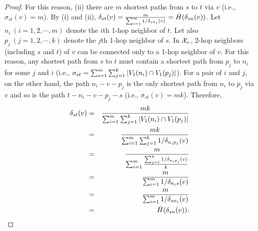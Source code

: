 \begin{theorem}
\begin{proof}
For this reason, (ii) there are $m$ shortest paths from $s$ to $t$ via $v$ (i.e., $\sigma_{st}(v)=m$).
By (i) and (ii), $\D{s}{t}{v} = \frac{m}{\sum_{i=1}^m 1/\D{s}{n_i}{v}} = \bar{H}(\D{s}{n}{v})$.
Let $n_i~(i=1,2,\cdots,m)$ denote the $i$th 1-hop neighbor of $t$. 
Let also $p_j~(j=1,2,\cdots,k)$ denote the $j$th 1-hop neighbor of $s$.
In $\XN{v}$, 2-hop neighbors (including $s$ and $t$) of $v$ can be connected only to a 1-hop neighbor of $v$.
For this reason, any shortest path from $s$ to $t$ must contain a shortest path from $p_j$ to $n_i$ for some $j$ and $i$ 
(i.e., $\sigma_{st} = \sum_{i=1}^m \sum_{j=1}^k |\V{n_i}{1} \cap \V{p_j}{1}|$). 
For a pair of $i$ and $j$, on the other hand, the path $n_i-v-p_j$ is the only shortest path from $n_i$ to $p_j$ via $v$ and so is the path $t-n_i-v-p_j-s$ (i.e., $\sigma_{st}(v)=mk$). 
Therefore, 
\begin{eqnarray}
\D{s}{t}{v} 
&=& \frac{mk}{\sum_{i=1}^m \sum_{j=1}^k |\V{n_i}{1} \cap \V{p_j}{1}|} \nonumber \\ 
&=& \frac{mk}{\sum_{i=1}^m \sum_{j=1}^k 1/\D{n_i}{p_j}{v}} \nonumber \\ 
&=& \frac{m}{\sum_{i=1}^m \frac {\sum_{j=1}^k 1/\D{n_i}{p_j}{v}}{k}} \nonumber \\ 
&=& \frac{m}{\sum_{i=1}^m 1/\D{n_i}{s}{v}} \nonumber \\ 
&=& \frac{m}{\sum_{i=1}^m 1/\D{s}{n_i}{v}} \nonumber  \\
&=& \bar{H}(\D{s}{n}{v}).   \nonumber
\end{eqnarray}
\label{harmonic_eq}
\end{proof}
\end{theorem}
